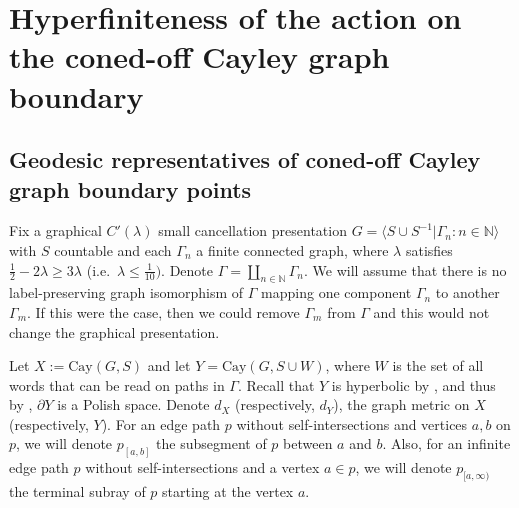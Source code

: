\documentclass{article}[11pt]
\newcommand{\N}{\mathbb{N}}
\begin{document}
{%

\section{Hyperfiniteness of the action on the coned-off Cayley graph boundary}

\subsection{Geodesic representatives of coned-off Cayley graph boundary points}

Fix a graphical $C'(\lambda)$ small cancellation presentation $G = \langle S \cup S^{-1} \vert \Gamma_n : n \in \N \rangle$ with $S$ countable and each $\Gamma_n$ a finite connected graph, where $\lambda$ satisfies $\frac12 - 2 \lambda \geq 3 \lambda$ (i.e.\ $\lambda \leq \frac1{10})$. Denote $\Gamma = \coprod_{n \in \N} \Gamma_n$. We will assume that there is no label-preserving graph isomorphism of $\Gamma$ mapping one component $\Gamma_n$ to another $\Gamma_m$. If this were the case, then we could remove $\Gamma_m$ from $\Gamma$ and this would not change the graphical presentation.  

Let $X := \mathrm{Cay}(G,S)$ and let $Y = \mathrm{Cay}(G, S \cup W)$, where $W$ is the set of all words that can be read on paths in $\Gamma$. Recall that $Y$ is hyperbolic by \cite[Theorem 3.1]{Gruber_Sisto}, and thus by \cite[Lemma 4.1]{MR4715159}, $\partial Y$ is a Polish space. Denote $d_X$ (respectively, $d_Y$), the graph metric on $X$ (respectively, $Y$). For an edge path $p$ without self-intersections and vertices $a,b$ on $p$, we will denote $p_{[a,b]}$ the subsegment of $p$ between $a$ and $b$. Also, for an infinite edge path $p$ without self-intersections and a vertex $a \in p$, we will denote $p_{[a, \infty)}$ the terminal subray of $p$ starting at the vertex $a$.

}
\end{document}
